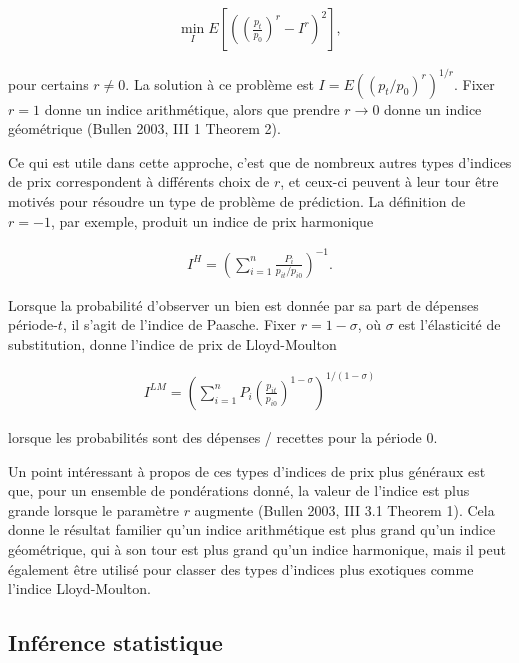 \documentclass[
]{article}
\begin{document}
\begin{align*}
\min_{I} E\left[\left(\left(\frac{p_{t}}{p_{0}} \right)^{r} - I^{r} \right)^{2} \right],
\end{align*}

pour certains \(r \neq 0\). La solution à ce problème est \(I = E((p_{t} / p_{0})^{r})^{1 / r}\). Fixer \(r = 1\) donne un indice arithmétique, alors que prendre \(r \rightarrow 0\) donne un indice géométrique (Bullen 2003, III 1 Theorem 2).

Ce qui est utile dans cette approche, c'est que de nombreux autres types d'indices de prix correspondent à différents choix de \(r\), et ceux-ci peuvent à leur tour être motivés pour résoudre un type de problème de prédiction. La définition de \(r = -1\), par exemple, produit un indice de prix harmonique

\begin{align*}
I^{H} = \left(\sum_{i = 1}^{n} \frac{P_{i}}{p_{it} / p_{i0}} \right)^{- 1}.
\end{align*}

Lorsque la probabilité d'observer un bien est donnée par sa part de dépenses période-\(t\), il s'agit de l'indice de Paasche. Fixer \(r = 1 - \sigma\), où \(\sigma\) est l'élasticité de substitution, donne l'indice de prix de Lloyd-Moulton

\begin{align*}
I^{LM} = \left(\sum_{i = 1}^{n} P_{i} \left(\frac{p_{it}}{p_{i0}} \right)^{1 - \sigma } \right)^{1 / (1 - \sigma)}
\end{align*}

lorsque les probabilités sont des dépenses / recettes pour la période 0.

Un point intéressant à propos de ces types d'indices de prix plus généraux est que, pour un ensemble de pondérations donné, la valeur de l'indice est plus grande lorsque le paramètre \(r\) augmente (Bullen 2003, III 3.1 Theorem 1). Cela donne le résultat familier qu'un indice arithmétique est plus grand qu'un indice géométrique, qui à son tour est plus grand qu'un indice harmonique, mais il peut également être utilisé pour classer des types d'indices plus exotiques comme l'indice Lloyd-Moulton.

\hypertarget{infuxe9rence-statistique}{%
\subsection{Inférence statistique}\label{infuxe9rence-statistique}}
\end{document}
